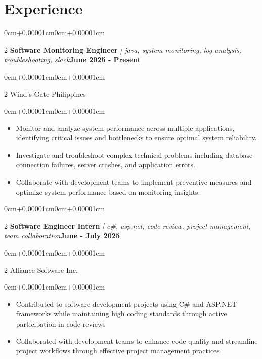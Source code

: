 \documentclass[10pt, letterpaper]{article}
\newenvironment{highlights}{\begin{itemize}[topsep=0.10cm,parsep=0.10cm,partopsep=0pt,itemsep=0pt,leftmargin=0cm+10pt]}{\end{itemize}}
\newenvironment{onecolentry}{\begin{adjustwidth}{0cm+0.00001cm}{0cm+0.00001cm}}{\end{adjustwidth}}
\newenvironment{twocolentry}[2][]{\onecolentry\def\secondColumn{#2}\setcolumnwidth{\fill,5cm}\begin{paracol}{2}}{\switchcolumn \raggedleft \secondColumn\end{paracol}\endonecolentry}
\begin{document}
\section{Experience}

    \begin{twocolentry}{\textbf{June 2025 - Present}}
    \textbf{Software Monitoring Engineer}\textit{ | java, system monitoring, log analysis, troubleshooting, slack}\end{twocolentry}
    \vspace{0.05cm}
    \begin{twocolentry}{}
    Wind's Gate Philippines\end{twocolentry}
    \vspace{0.10cm}
    \begin{onecolentry}
        \begin{highlights}
            \item Monitor and analyze system performance across multiple applications, identifying critical issues and bottlenecks to ensure optimal system reliability.
            \item Investigate and troubleshoot complex technical problems including database connection failures, server crashes, and application errors.
            \item Collaborate with development teams to implement preventive measures and optimize system performance based on monitoring insights.
        \end{highlights}
    \end{onecolentry}
    \vspace{0.15cm}

    \begin{twocolentry}{\textbf{June - July 2025}}
    \textbf{Software Engineer Intern}\textit{ | c\#, asp.net, code review, project management, team collaboration}\end{twocolentry}
    \vspace{0.05cm}
    \begin{twocolentry}{}
    Alliance Software Inc.\end{twocolentry}
    \vspace{0.10cm}
    \begin{onecolentry}
        \begin{highlights}
            \item Contributed to software development projects using C\# and ASP.NET frameworks while maintaining high coding standards through active participation in code reviews
            \item Collaborated with development teams to enhance code quality and streamline project workflows through effective project management practices
        \end{highlights}
    \end{onecolentry}
    \vspace{0.15cm}
\end{document}
